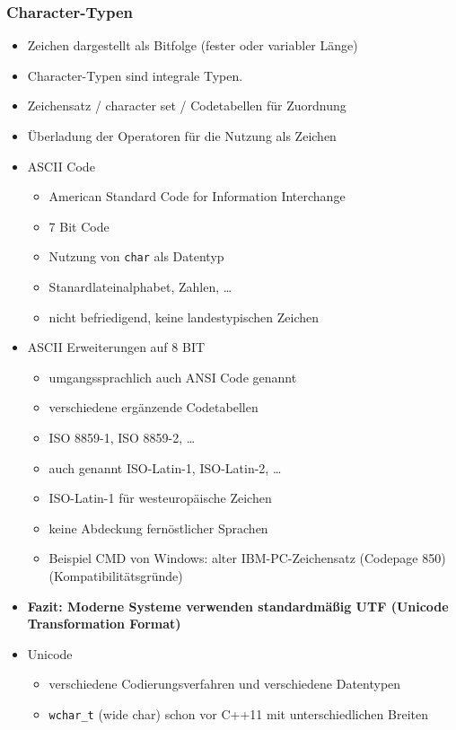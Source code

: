\documentclass[a4paper]{report}
\begin{document}
\subsubsection{Character-Typen}
\begin{itemize}
	\item Zeichen dargestellt als Bitfolge (fester oder variabler Länge)
	\item Character-Typen sind integrale Typen.
	\item Zeichensatz / character set / Codetabellen für Zuordnung
	\item Überladung der Operatoren für die Nutzung als Zeichen
	\bigskip
	\item ASCII Code
	\begin{itemize}
		\item American Standard Code for Information Interchange
		\item 7 Bit Code
		\item Nutzung von \texttt{char} als Datentyp
		\item Stanardlateinalphabet, Zahlen, \dots
		\item nicht befriedigend, keine landestypischen Zeichen
		\bigskip
	\end{itemize}
	\item ASCII Erweiterungen auf 8 BIT
	\begin{itemize}
			\item umgangssprachlich auch ANSI Code genannt
			\item verschiedene ergänzende Codetabellen
			\item ISO 8859-1, ISO 8859-2, \dots
			\item auch genannt ISO-Latin-1, ISO-Latin-2, \dots
			\item ISO-Latin-1 für westeuropäische Zeichen
			\item keine Abdeckung fernöstlicher Sprachen
			\item Beispiel CMD von Windows: alter IBM-PC-Zeichensatz (Codepage 850) (Kompatibilitätsgründe)		
	\end{itemize}
	\bigskip
	\item \textbf{Fazit: Moderne Systeme verwenden standardmäßig UTF (Unicode Transformation Format)}
	\bigskip
	\item Unicode
	\begin{itemize}
		\item verschiedene Codierungsverfahren und verschiedene Datentypen
		\item \texttt{wchar\_t} (wide char) schon vor C++11 mit unterschiedlichen Breiten

\end{itemize}
\end{itemize}
\end{document}
